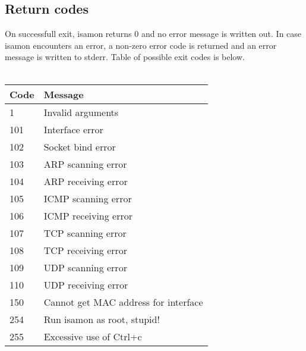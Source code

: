 \documentclass[11pt,a4paper]{article}
\begin{document}
	\subsection{Return codes}
		On successfull exit, isamon returns 0 and no error message is written out.
		In case isamon encounters an error, a non-zero error code is returned and an error message is written to stderr. Table of possible exit codes is below.\\\\
		
		\begin{tabular}{|l|l|}
			\hline
			\textbf{Code}  & \textbf{Message} \\\hline
			1     & Invalid arguments \\\hline
			101   & Interface error \\\hline
			102   & Socket bind error \\\hline
			103   & ARP scanning error \\\hline
			104   & ARP receiving error \\\hline
			105   & ICMP scanning error \\\hline
			106   & ICMP receiving error \\\hline
			107   & TCP scanning error \\\hline
			108   & TCP receiving error \\\hline
			109   & UDP scanning error \\\hline
			110   & UDP receiving error \\\hline
			150   & Cannot get MAC address for interface \\\hline
			254   & Run isamon as root, stupid! \\\hline
			255   & Excessive use of Ctrl+c \\\hline
		\end{tabular}
\end{document}
